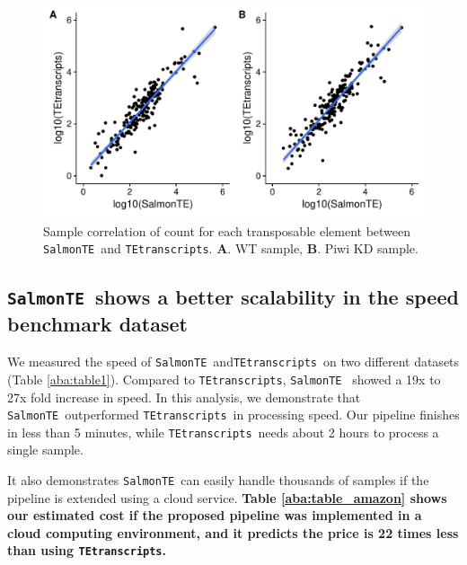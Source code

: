 \documentclass[wsdraft]{ws-procs11x85}
\newcommand{\TEtranscripts}{\texttt{TEtranscripts}}
\newcommand{\SalmonTE}{\texttt{SalmonTE}}
\begin{document}
\begin{figure}[h]
\centerline{
\includegraphics[width=13cm]{figure_corr_count}
}
\caption{Sample correlation of count for each transposable element between \SalmonTE~and \TEtranscripts. \textbf{A}. WT sample, \textbf{B}. Piwi KD sample.}
\label{aba:fig3}
\end{figure}



\subsection{\SalmonTE~shows a better scalability in the speed benchmark dataset}
We measured the speed of \SalmonTE~and\TEtranscripts~on two different datasets (Table \ref{aba:table1}).  
Compared to \TEtranscripts,  \SalmonTE~ showed a 19x to 27x fold increase in speed.
In this analysis, we demonstrate that \SalmonTE~outperformed \TEtranscripts~in processing speed. Our pipeline finishes in less than 5 minutes, while \TEtranscripts~needs about 2 hours to process a single sample. 

It also demonstrates \SalmonTE~can easily handle thousands of samples if the pipeline is extended using a cloud service. 
\textbf{Table \ref{aba:table_amazon} shows our estimated cost if the proposed pipeline was implemented in a cloud computing environment, and it predicts the price is 22 times less than using \TEtranscripts. } 
\end{document}
